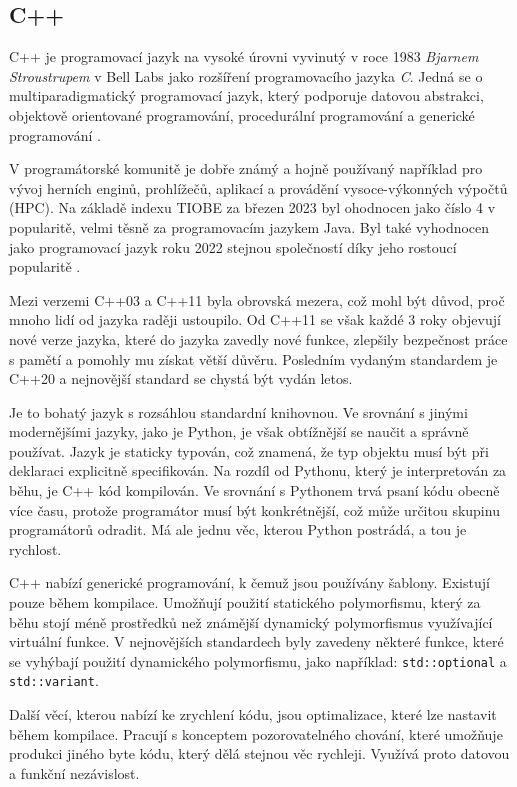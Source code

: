 \subsection{C++}
C++ je programovací jazyk na vysoké úrovni vyvinutý v roce 1983 \textit{Bjarnem Stroustrupem} v Bell Labs jako rozšíření programovacího jazyka \textit{C}.
Jedná se o multiparadigmatický programovací jazyk, který podporuje datovou abstrakci, objektově orientované programování, procedurální programování a generické programování \cite{cpp}.

V programátorské komunitě je dobře známý a hojně používaný například pro vývoj herních enginů, prohlížečů, aplikací a provádění vysoce-výkonných výpočtů (HPC).
Na základě indexu TIOBE za březen 2023 byl ohodnocen jako číslo 4 v popularitě, velmi těsně za programovacím jazykem Java.
Byl také vyhodnocen jako programovací jazyk roku 2022 stejnou společností díky jeho rostoucí popularitě  \cite{tiobe}.

Mezi verzemi C++03 a C++11 byla obrovská mezera, což mohl být důvod, proč mnoho lidí od jazyka raději ustoupilo.
Od C++11 se však každé 3 roky objevují nové verze jazyka, které do jazyka zavedly nové funkce, zlepšily bezpečnost práce s pamětí a pomohly mu získat větší důvěru.
Posledním vydaným standardem je C++20 a nejnovější standard se chystá být vydán letos.

Je to bohatý jazyk s rozsáhlou standardní knihovnou.
Ve srovnání s jinými modernějšími jazyky, jako je Python, je však obtížnější se naučit a správně používat.
Jazyk je staticky typován, což znamená, že typ objektu musí být při deklaraci explicitně specifikován.
Na rozdíl od Pythonu, který je interpretován za běhu, je C++ kód kompilován.
Ve srovnání s Pythonem trvá psaní kódu obecně více času, protože programátor musí být konkrétnější, což může určitou skupinu programátorů odradit.
Má ale jednu věc, kterou Python postrádá, a tou je rychlost.

C++ nabízí generické programování, k čemuž jsou používány šablony.
Existují pouze během kompilace.
Umožňují použití statického polymorfismu, který za běhu stojí méně prostředků než známější dynamický polymorfismus využívající virtuální funkce.
V nejnovějších standardech byly zavedeny některé funkce, které se vyhýbají použití dynamického polymorfismu, jako například: \texttt{std::optional} a \texttt{std::variant}.

Další věcí, kterou nabízí ke zrychlení kódu, jsou optimalizace, které lze nastavit během kompilace.
Pracují s konceptem pozorovatelného chování, které umožňuje produkci jiného byte kódu, který dělá stejnou věc rychleji.
Využívá proto datovou a funkční nezávislost.

